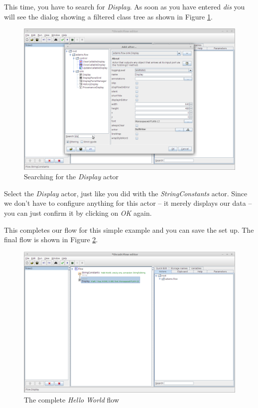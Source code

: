 This time, you have to search for \textit{Display}. As soon as you have
entered \textit{dis} you will see the dialog showing a filtered class tree
as shown in Figure \ref{floweditor-helloworld-addactor7}.

\begin{figure}[htb]
  \centering
  \includegraphics[width=12.0cm]{images/floweditor-helloworld-addactor7.png}
  \caption{Searching for the \textit{Display} actor}
  \label{floweditor-helloworld-addactor7}
\end{figure}

Select the \textit{Display} actor, just like you did with the
\textit{StringConstants} actor. Since we don't have to configure anything for
this actor -- it merely displays our data -- you can just confirm it by clicking
on \textit{OK} again.

This completes our flow for this simple example and you can save the set up. The
final flow is shown in Figure \ref{floweditor-helloworld-flow}.

\begin{figure}[htb]
  \centering
  \includegraphics[width=12.0cm]{images/floweditor-helloworld-flow.png}
  \caption{The complete \textit{Hello World} flow}
  \label{floweditor-helloworld-flow}
\end{figure}

